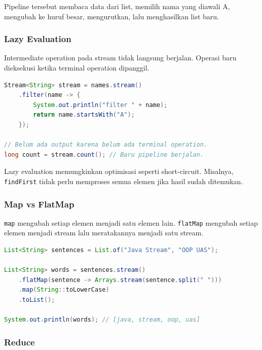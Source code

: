 Pipeline tersebut membaca data dari list, memilih nama yang diawali A, mengubah ke huruf besar, mengurutkan, lalu menghasilkan list baru.

\subsubsection{Lazy Evaluation}

\begin{jawab}
Intermediate operation pada stream tidak langsung berjalan. Operasi baru dieksekusi ketika terminal operation dipanggil.
\end{jawab}

\begin{lstlisting}[language=Java, caption={Lazy evaluation pada stream}, label={lst:stream-lazy}]
Stream<String> stream = names.stream()
    .filter(name -> {
        System.out.println("filter " + name);
        return name.startsWith("A");
    });

// Belum ada output karena belum ada terminal operation.
long count = stream.count(); // Baru pipeline berjalan.
\end{lstlisting}

Lazy evaluation memungkinkan optimisasi seperti short-circuit. Misalnya, \texttt{findFirst} tidak perlu memproses semua elemen jika hasil sudah ditemukan.

\subsubsection{Map vs FlatMap}

\begin{jawab}
\texttt{map} mengubah setiap elemen menjadi satu elemen lain. \texttt{flatMap} mengubah setiap elemen menjadi stream lalu meratakannya menjadi satu stream.
\end{jawab}

\begin{lstlisting}[language=Java, caption={map dan flatMap}, label={lst:map-flatmap}]
List<String> sentences = List.of("Java Stream", "OOP UAS");

List<String> words = sentences.stream()
    .flatMap(sentence -> Arrays.stream(sentence.split(" ")))
    .map(String::toLowerCase)
    .toList();

System.out.println(words); // [java, stream, oop, uas]
\end{lstlisting}

\subsubsection{Reduce}

